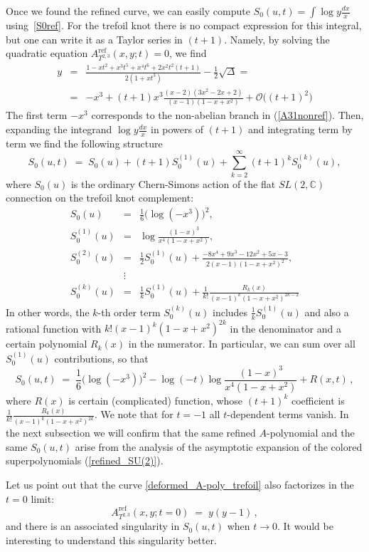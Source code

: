 \documentclass[hyper,letterpaper]{JHEP3}
\newcommand{\bea}{\begin{eqnarray}}
\newcommand{\eea}{\end{eqnarray}}
\newcommand{\be}{\begin{equation}}
\newcommand{\ee}{\end{equation}}
\newcommand{\C}{{\mathbb C}}
\begin{document}
Once we found the refined curve,
we can easily compute $S_0(u,t)=\int \log y \frac{dx}{x}$ using~\eqref{S0ref}.
For the trefoil knot there is no compact expression for this integral,
but one can write it as a Taylor series in $(t+1)$.
Namely, by solving the quadratic equation $A^{\text{ref}}_{T^{2,3}}(x,y;t)=0$, we find
\bea
y & = & \frac{1 - x t^2 + x^3 t^5 + x^4 t^6 + 2 x^2 t^2 (t+1)}{2(1 + x t^3)} - \frac{1}{2}\sqrt{\Delta} = \nonumber \\
& =& -x^3 + (t+1) x^3
\frac{(x-2) (3 x^2 -2x +2) }{(x-1) (1 - x + x^2)} + \mathcal{O}\big((t+1)^2\big)
\eea
The first term $-x^3$ corresponds to the non-abelian branch in (\ref{A31nonref}).
Then, expanding the integrand $\log y \frac{dx}{x}$ in powers of $(t+1)$
and integrating term by term we find the following structure
\be
S_0(u,t) \; = \; S_0(u) + (t+1) S_0^{(1)}(u) + \sum_{k=2}^{\infty} (t+1)^k S_0^{(k)}(u),
\ee
where $S_0(u)$ is the ordinary Chern-Simons action of the flat
$SL(2,\C)$ connection on the trefoil knot complement:
\bea
S_0(u) & = & \frac{1}{6}\Big(\log (-x^3)\Big)^2, \nonumber\\
S_0^{(1)}(u) & = & \log\frac{(1-x)^3}{x^4 (1-x+x^2)}, \nonumber \\
S_0^{(2)}(u) & = & \frac{1}{2} S_0^{(1)}(u) + \frac{-8x^4 +9x^3 -12x^2 + 5x -3}{2( x-1 ) (1 -x +x^2)^2}, \nonumber \\
& \vdots & \nonumber\\
S_0^{(k)}(u) & = & \frac{1}{k} S_0^{(1)}(u) + \frac{1}{k!} \frac{R_k(x)}{( x-1 )^k (1 -x +x^2)^{2k-2}} \nonumber
\eea
In other words, the $k$-th order term $S_0^{(k)}(u)$ includes $\frac{1}{k} S_0^{(1)}(u)$
and also a rational function with $k! ( x-1 )^k (1 -x +x^2)^{2k}$ in the denominator
and a certain polynomial $R_k(x)$ in the numerator.
In particular, we can sum over all $S_0^{(1)}(u)$ contributions, so that
\be
S_0(u,t) \; = \; \frac{1}{6}\Big(\log (-x^3)\Big)^2 - \log(- t) \log\frac{(1-x)^3}{x^4 (1-x+x^2)} + R(x,t) \,,
\label{S0ut-trefoil}
\ee
where $R(x)$ is certain (complicated) function, whose $(t+1)^k$ coefficient is $\frac{1}{k!} \frac{R_k(x)}{( x-1 )^k (1 -x +x^2)^{2k}}$.
We note that for $t=-1$ all $t$-dependent terms vanish. In the next subsection we will confirm that the same refined $A$-polynomial and the same $S_0(u,t)$ arise from the analysis of the asymptotic expansion of the colored superpolynomials (\ref{refined_SU(2)}).

Let us point out that the curve \eqref{deformed_A-poly_trefoil} also factorizes in the $t=0$ limit:
$$
A^{\text{ref}}_{T^{2,3}}(x,y;t=0) \; = \; y(y-1) \,,
$$
and there is an associated singularity in $S_0(u,t)$ when $t\to 0$.
It would be interesting to understand this singularity better.
\end{document}
